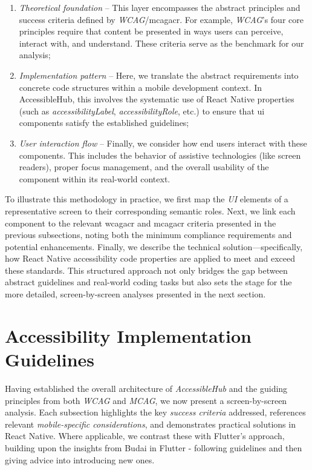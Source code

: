 \begin{enumerate}
    \item \textit{Theoretical foundation} – This layer encompasses the abstract principles and success criteria defined by \textit{WCAG}/\acrshort{mcagacr}. For example, \textit{WCAG}’s four core principles require that content be presented in ways users can perceive, interact with, and understand. These criteria serve as the benchmark for our analysis;

    \item \textit{Implementation pattern} – Here, we translate the abstract requirements into concrete code structures within a mobile development context. In AccessibleHub, this involves the systematic use of React Native properties (such as \textit{accessibilityLabel}, \textit{accessibilityRole}, etc.) to ensure that \acrshort{ui} components satisfy the established guidelines;

    \item \textit{User interaction flow} – Finally, we consider how end users interact with these components. This includes the behavior of assistive technologies (like screen readers), proper focus management, and the overall usability of the component within its real-world context.
\end{enumerate}

To illustrate this methodology in practice, we first map the \textit{UI} elements of a representative screen to their corresponding semantic roles. Next, we link each component to the relevant \acrshort{wcagacr} and \acrshort{mcagacr} criteria presented in the previous subsections, noting both the minimum compliance requirements and potential enhancements. Finally, we describe the technical solution—specifically, how React Native accessibility code properties are applied to meet and exceed these standards. This structured approach not only bridges the gap between abstract guidelines and real-world coding tasks but also sets the stage for the more detailed, screen-by-screen analyses presented in the next section.

\section{Accessibility Implementation Guidelines}
\label{sec:implementation-guidelines}

Having established the overall architecture of \textit{AccessibleHub} and the guiding principles from both \textit{WCAG} and \textit{MCAG}, we now present a screen-by-screen analysis. Each subsection highlights the key \textit{success criteria} addressed, references relevant \textit{mobile-specific considerations}, and demonstrates practical solutions in React Native. Where applicable, we contrast these with Flutter's approach, building upon the insights from Budai \cite{budai2024mobile} in Flutter - following guidelines and then giving advice into introducing new ones.

